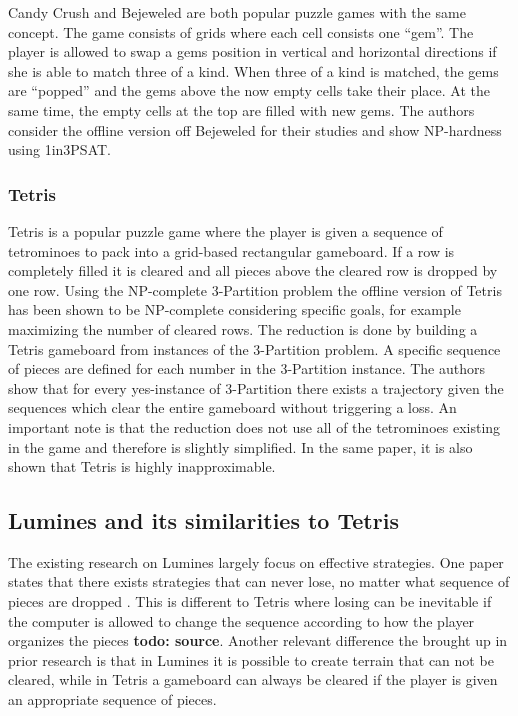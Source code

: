 Candy Crush and Bejeweled are both popular puzzle games with the same concept. The game consists of grids where each cell consists one ``gem''. The player is allowed to swap a gems position in vertical and horizontal directions if she is able to match three of a kind. When three of a kind is matched, the gems are ``popped'' and the gems above the now empty cells take their place. At the same time, the empty cells at the top are filled with new gems. The authors consider the offline version off Bejeweled for their studies and show NP-hardness using 1in3PSAT. \cite{candy}

\subsubsection{Tetris}

Tetris is a popular puzzle game where the player is given a sequence of tetrominoes to pack into a grid-based rectangular gameboard. If a row is completely filled it is cleared and all pieces above the cleared row is dropped by one row. Using the NP-complete 3-Partition problem the offline version of Tetris has been shown to be NP-complete considering specific goals, for example maximizing the number of cleared rows. The reduction is done by building a Tetris gameboard from instances of the 3-Partition problem. A specific sequence of pieces are defined for each number in the 3-Partition instance. The authors show that for every yes-instance of 3-Partition there exists a trajectory given the sequences which clear the entire gameboard without triggering a loss. An important note is that the reduction does not use all of the tetrominoes existing in the game and therefore is slightly simplified. In the same paper, it is also shown that Tetris is highly inapproximable. 

\subsection{Lumines and its similarities to Tetris}
\label{subsub:sim}

The existing research on Lumines largely focus on effective strategies. One paper states that there exists strategies that can never lose, no matter what sequence of pieces are dropped \cite{lumines}. This is different to Tetris where losing can be inevitable if the computer is allowed to change the sequence according to how the player organizes the pieces \textbf{todo: source}. Another relevant difference the brought up in prior research is that in Lumines it is possible to create terrain that can not be cleared, while in Tetris a gameboard can always be cleared if the player is given an appropriate sequence of pieces.

